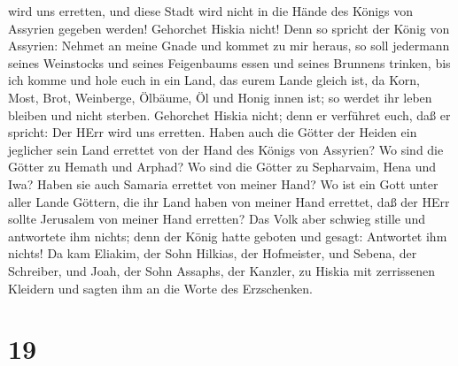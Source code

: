 wird uns erretten, und diese Stadt wird nicht in die Hände des Königs
von Assyrien gegeben werden!  Gehorchet Hiskia nicht! Denn
so spricht der König von Assyrien: Nehmet an meine Gnade und kommet zu
mir heraus, so soll jedermann seines Weinstocks und seines Feigenbaums
essen und seines Brunnens trinken,  bis ich komme und hole
euch in ein Land, das eurem Lande gleich ist, da Korn, Most, Brot,
Weinberge, Ölbäume, Öl und Honig innen ist; so werdet ihr leben bleiben
und nicht sterben. Gehorchet Hiskia nicht; denn er verführet euch, daß
er spricht: Der HErr wird uns erretten.  Haben auch die
Götter der Heiden ein jeglicher sein Land errettet von der Hand des
Königs von Assyrien?  Wo sind die Götter zu Hemath und
Arphad? Wo sind die Götter zu Sepharvaim, Hena und Iwa? Haben sie auch
Samaria errettet von meiner Hand?  Wo ist ein Gott unter
aller Lande Göttern, die ihr Land haben von meiner Hand errettet, daß
der HErr sollte Jerusalem von meiner Hand erretten?  Das
Volk aber schwieg stille und antwortete ihm nichts; denn der König hatte
geboten und gesagt: Antwortet ihm nichts!  Da kam Eliakim,
der Sohn Hilkias, der Hofmeister, und Sebena, der Schreiber, und Joah,
der Sohn Assaphs, der Kanzler, zu Hiskia mit zerrissenen Kleidern und
sagten ihm an die Worte des Erzschenken.

\hypertarget{section-18}{%
\section{19}\label{section-18}}

